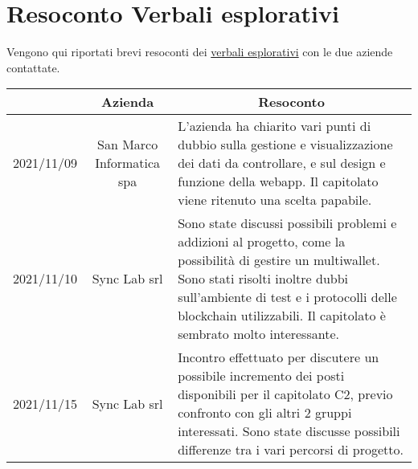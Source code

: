 \section{Resoconto Verbali esplorativi}\label{section:resoconto_verbali}

Vengono qui riportati brevi resoconti dei \href{https://yakuzaishi-swe.github.io/docs/}{verbali esplorativi} con le due aziende contattate.

\begin{center}
	\renewcommand{\arraystretch}{1.8}
	\begin{longtable}[c]{c | c | p{5cm}}
		\rowcolor[HTML]{125E28}
		\multicolumn{1}{c}{\color[HTML]{FFFFFF} \textbf{Data}} & 
		\multicolumn{1}{c}{\color[HTML]{FFFFFF} \textbf{Azienda}} & 
		\multicolumn{1}{c}{\color[HTML]{FFFFFF} \textbf{Resoconto}} \\
		\endhead
		2021/11/09 & San Marco Informatica spa & L'azienda ha chiarito vari punti di dubbio sulla gestione e visualizzazione dei dati da controllare, e sul design e funzione della webapp. Il capitolato viene ritenuto una scelta papabile. \\
        2021/11/10 & Sync Lab srl & Sono state discussi possibili problemi e addizioni al progetto, come la possibilità di gestire un multiwallet. Sono stati risolti inoltre dubbi sull'ambiente di test e i protocolli delle blockchain\glo{} utilizzabili. Il capitolato è sembrato molto interessante.\\
        2021/11/15 & Sync Lab srl & Incontro effettuato per discutere un possibile incremento dei posti disponibili per il capitolato C2, previo confronto con gli altri 2 gruppi interessati. Sono state discusse possibili differenze tra i vari percorsi di progetto. \\
	\end{longtable}
\end{center}